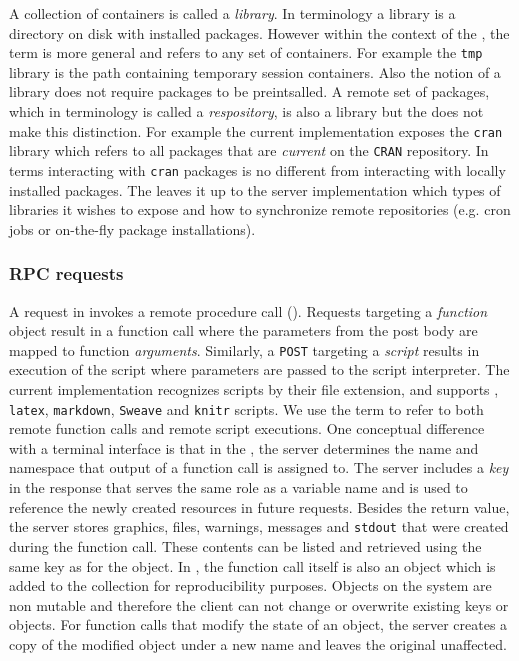 A collection of containers is called a \emph{library}. In \R terminology a library is a directory on disk with installed packages. However within the context of the \API, the term is more general and refers to any set of containers. For example the \texttt{tmp} library is the \API path containing temporary session containers. Also the \API notion of a library does not require packages to be preintsalled. A remote set of packages, which in \R terminology is called a \emph{respository}, is also a library but the \API does not make this distinction. For example the current implementation exposes the \texttt{cran} library which refers to all packages that are \emph{current} on the \texttt{CRAN} repository. In \API terms interacting with \texttt{cran} packages is no different from interacting with locally installed packages. The \API leaves it up to the server implementation which types of libraries it wishes to expose and how to synchronize remote repositories (e.g. cron jobs or on-the-fly package installations).

\subsubsection{RPC requests}

A \POST request in \OpenCPU invokes a remote procedure call (\RPC). Requests targeting a \emph{function} object result in a function call where the \HTTP parameters from the post body are mapped to function \emph{arguments}. Similarly, a \texttt{POST} targeting a \emph{script} results in execution of the script where \HTTP parameters are passed to the script interpreter. The current \OpenCPU implementation recognizes scripts by their file extension, and supports \R, \texttt{latex}, \texttt{markdown}, \texttt{Sweave} and \texttt{knitr} scripts. We use the term \RPC to refer to both remote function calls and remote script executions. One conceptual difference with a terminal interface is that in the \OpenCPU \API, the server determines the name and namespace that output of a function call is assigned to. The server includes a \emph{key} in the \RPC response that serves the same role as a variable name and is used to reference the newly created resources in future requests. Besides the return value, the server stores graphics, files, warnings, messages and \texttt{stdout} that were created during the function call. These contents can be listed and retrieved using the same key as for the object. In \R, the function call itself is also an object which is added to the collection for reproducibility purposes. Objects on the system are non mutable and therefore the client can not change or overwrite existing keys or objects. For function calls that modify the state of an object, the server creates a copy of the modified object under a new name and leaves the original unaffected.

